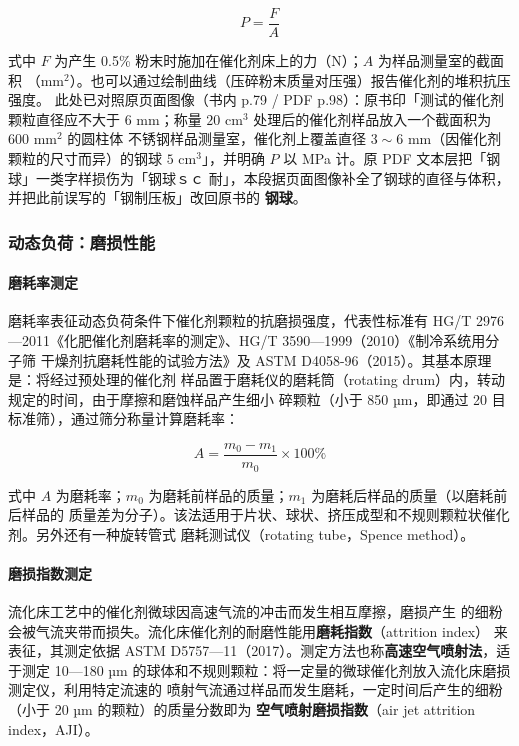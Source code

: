 \begin{equation}\label{eq:ch01c-crush}
P=\frac{F}{A}
\end{equation}

式中 $F$ 为产生 0.5\% 粉末时施加在催化剂床上的力（N）；$A$ 为样品测量室的截面积
（$\mathrm{mm^2}$）。也可以通过绘制曲线（压碎粉末质量对压强）报告催化剂的堆积抗压强度。
此处已对照原页面图像（书内 p.79 / PDF p.98）：原书印「测试的催化剂颗粒直径应不大于
$6$ mm；称量 $20$ cm$^{3}$ 处理后的催化剂样品放入一个截面积为 $600$ mm$^{2}$ 的圆柱体
不锈钢样品测量室，催化剂上覆盖直径 $3\sim6$ mm（因催化剂颗粒的尺寸而异）的钢球
$5$ cm$^{3}$」，并明确 $P$ 以 MPa 计。原 PDF 文本层把「钢球」一类字样损伤为「钢球ｓｃ
耐」，本段据页面图像补全了钢球的直径与体积，并把此前误写的「钢制压板」改回原书的
\textbf{钢球}。

\subsubsection{动态负荷：磨损性能}

\paragraph{磨耗率测定}磨耗率表征动态负荷条件下催化剂颗粒的抗磨损强度，代表性标准有
HG/T 2976—2011《化肥催化剂磨耗率的测定》、HG/T 3590—1999（2010）《制冷系统用分子筛
干燥剂抗磨耗性能的试验方法》及 ASTM D4058-96（2015）。其基本原理是：将经过预处理的催化剂
样品置于磨耗仪的磨耗筒（rotating drum）内，转动规定的时间，由于摩擦和磨蚀样品产生细小
碎颗粒（小于 850 µm，即通过 20 目标准筛），通过筛分称量计算磨耗率：

\begin{equation}\label{eq:ch01c-attrition}
A=\frac{m_{0}-m_{1}}{m_{0}}\times 100\%
\end{equation}

式中 $A$ 为磨耗率；$m_0$ 为磨耗前样品的质量；$m_1$ 为磨耗后样品的质量（以磨耗前后样品的
质量差为分子）。该法适用于片状、球状、挤压成型和不规则颗粒状催化剂。另外还有一种旋转管式
磨耗测试仪（rotating tube，Spence method）。

\paragraph{磨损指数测定}流化床工艺中的催化剂微球因高速气流的冲击而发生相互摩擦，磨损产生
的细粉会被气流夹带而损失。流化床催化剂的耐磨性能用\textbf{磨耗指数}（attrition index）
来表征，其测定依据 ASTM D5757—11（2017）。测定方法也称\textbf{高速空气喷射法}，适于测定
10—180 µm 的球体和不规则颗粒：将一定量的微球催化剂放入流化床磨损测定仪，利用特定流速的
喷射气流通过样品而发生磨耗，一定时间后产生的细粉（小于 20 µm 的颗粒）的质量分数即为
\textbf{空气喷射磨损指数}（air jet attrition index，AJI）。

